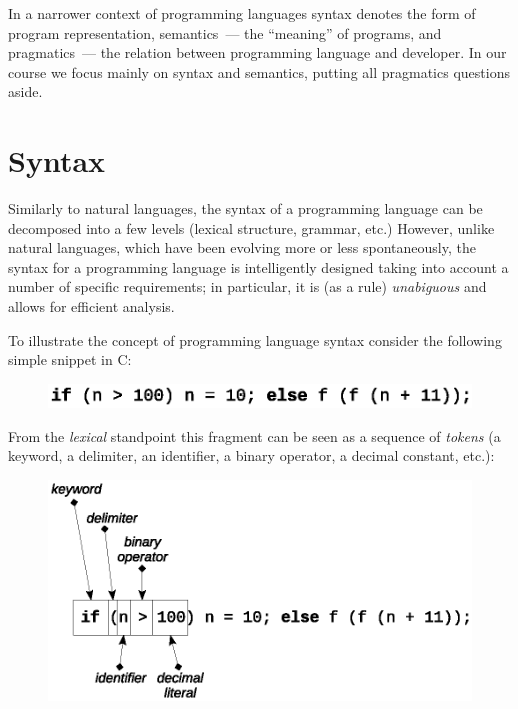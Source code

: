 \documentclass{article}
\begin{document}
In a narrower context of programming languages syntax denotes the form of program representation, semantics~--- the ``meaning'' of programs, and pragmatics~---
the relation between programming language and developer. In our course we focus mainly on syntax and semantics, putting all pragmatics questions aside.

\section{Syntax}

Similarly to natural languages, the syntax of a programming language can be decomposed into a few levels (lexical structure, grammar, etc.) However,
unlike natural languages, which have been evolving more or less spontaneously, the syntax for a programming language is intelligently designed taking
into account a number of specific requirements; in particular, it is (as a rule) \emph{unabiguous} and allows for efficient analysis.

To illustrate the concept of programming language syntax consider the following simple snippet in \textsc{C}:

\begin{figure}[h]
  \centering
  \includegraphics[scale=0.7]{images/01-01.eps}
\end{figure}

From the \emph{lexical} standpoint this fragment can be seen as a sequence of \emph{tokens} (a keyword, a delimiter, an identifier, a binary operator,
a decimal constant, etc.):

\begin{figure}[h]
  \centering
  \includegraphics[scale=0.7]{images/01-02.eps}
\end{figure}
\end{document}
